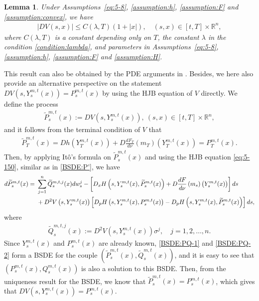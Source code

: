 \documentclass[11pt]{article}
\numberwithin{equation}{section}
\newtheorem{lemma}[theorem]{Lemma}
\newcommand{\brn}{{\mathbb{R}^n}}
\newcommand{\1}{\mbox{1\hspace{-1mm}I}}
\begin{document}
\begin{lemma}\label{lem:global:1}
Under Assumptions~\ref{eq:5-8}, \ref{assumption:h}, \ref{assumption:F} and \ref{assumption:convex}, we have
\begin{align}\label{lem:global:1-0}
    |DV(s,x)|\le C(\lambda,T) (1+|x|),\quad (s,x)\in[t,T]\times\brn,
\end{align}
where $C(\lambda,T)$ is a constant depending only on $T$, the constant $\lambda$ in the condition \eqref{condition:lambda}, and parameters in Assumptions~\ref{eq:5-8}, \ref{assumption:h}, \ref{assumption:F} and \ref{assumption:H}.
\end{lemma}

This result can also be obtained by the PDE arguments in \cite{Delarue2002,Ma-Yong}. Besides, we here also provide an alternative perspective on the statement $DV\left(s,Y^{m,t}_s(x)\right)=P^{m,t}_s(x)$ by using the HJB equation of $V$ directly. We define the process 
\begin{align*}
    \widetilde{P}^{m,t}_s(x):=DV\left(s,Y^{m,t}_s(x)\right),\ (s,x)\in[t,T]\times\brn,
\end{align*}
and it follows from the terminal condition of $V$ that
\begin{align}\label{BSDE:PQ-1}
    \widetilde{P}^{m,t}_T(x)= Dh\left(Y^{m,t}_T(x)\right) + D\frac{dF_T}{d\nu}\left(m_T\right)\left(Y^{m,t}_T(x)\right)=P^{m,t}_T(x).
\end{align}
Then, by applying It\^o's formula on $\widetilde{P}^{m,t}_s(x)$ and using the HJB equation \eqref{eq:5-150}, similar as in \eqref{BSDE:P'}, we have
\begin{align}
    d\widetilde{P}^{m,t}_s(x)=\ &  \sum_{j=1}^{n}\widetilde{Q}^{m,t,j}_s(x) dw^j_s -\left[D_{x}H\left(s,Y^{m,t}_s(x),\widetilde{P}^{m,t}_s(x)\right)+D\dfrac{dF}{d\nu}\left(m_s\right)\left(Y^{m,t}_s(x)\right)\right] ds \notag \\
    & + D^2V\left(s,Y^{m,t}_s(x)\right) \left[D_{p}H\left(s,Y^{m,t}_s(x),P^{m,t}_s(x)\right)-D_{p}H\left(s,Y^{m,t}_s(x),\widetilde{P}^{m,t}_s(x)\right) \right] ds, \label{BSDE:PQ-2}
\end{align}
where
\begin{align*}
    \widetilde{Q}^{m,t,j}_s(x):=D^2V\left(s,Y^{m,t}_s(x)\right)\sigma^j,\quad j=1,2,\dots,n.
\end{align*}
Since $Y^{m,t}_s(x)$ and $P^{m,t}_s(x)$ are already known, \eqref{BSDE:PQ-1} and \eqref{BSDE:PQ-2} form a BSDE for the couple $\left(\widetilde{P}^{m,t}_s(x),\widetilde{Q}^{m,t}_s(x)\right)$, and it is easy to see that $\left(P^{m,t}_s(x),Q^{m,t}_s(x)\right)$ is also a solution to this BSDE. Then, from the uniqueness result for the BSDE, we know that $\widetilde{P}^{m,t}_s(x)=P^{m,t}_s(x)$, which gives that $DV\left(s,Y^{m,t}_s(x)\right)=P^{m,t}_s(x)$.
\end{document}
